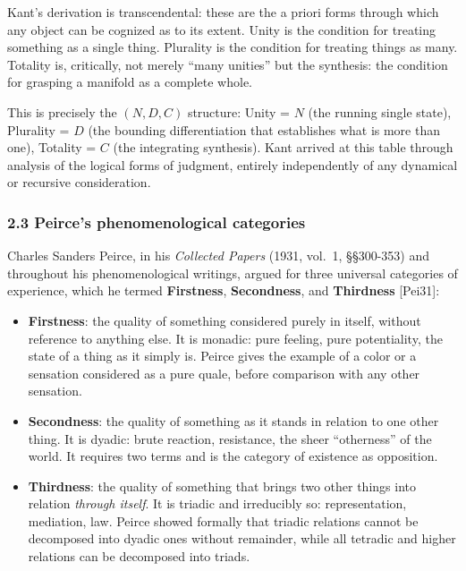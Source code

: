 \documentclass[
  11pt,
  letterpaper,
]{article}
\providecommand{\tightlist}{%
  \setlength{\itemsep}{0pt}\setlength{\parskip}{0pt}}
\begin{document}
Kant's derivation is transcendental: these are the a priori forms
through which any object can be cognized as to its extent. Unity is the
condition for treating something as a single thing. Plurality is the
condition for treating things as many. Totality is, critically, not
merely ``many unities'' but the synthesis: the condition for grasping a
manifold as a complete whole.

This is precisely the \((N, D, C)\) structure: Unity = \(N\) (the
running single state), Plurality = \(D\) (the bounding differentiation
that establishes what is more than one), Totality = \(C\) (the
integrating synthesis). Kant arrived at this table through analysis of
the logical forms of judgment, entirely independently of any dynamical
or recursive consideration.

\subsubsection{2.3 Peirce's phenomenological
categories}\label{peirces-phenomenological-categories}

Charles Sanders Peirce, in his \emph{Collected Papers} (1931, vol.~1,
§§300-353) and throughout his phenomenological writings, argued for
three universal categories of experience, which he termed
\textbf{Firstness}, \textbf{Secondness}, and \textbf{Thirdness}
{[}Pei31{]}:

\begin{itemize}
\tightlist
\item
  \textbf{Firstness}: the quality of something considered purely in
  itself, without reference to anything else. It is monadic: pure
  feeling, pure potentiality, the state of a thing as it simply is.
  Peirce gives the example of a color or a sensation considered as a
  pure quale, before comparison with any other sensation.
\item
  \textbf{Secondness}: the quality of something as it stands in relation
  to one other thing. It is dyadic: brute reaction, resistance, the
  sheer ``otherness'' of the world. It requires two terms and is the
  category of existence as opposition.
\item
  \textbf{Thirdness}: the quality of something that brings two other
  things into relation \emph{through itself}. It is triadic and
  irreducibly so: representation, mediation, law. Peirce showed formally
  that triadic relations cannot be decomposed into dyadic ones without
  remainder, while all tetradic and higher relations can be decomposed
  into triads.
\end{itemize}
\end{document}
